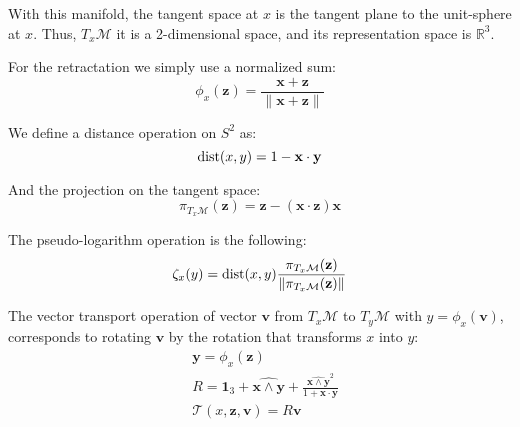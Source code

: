 With this manifold, the tangent space at $x$ is the tangent plane to the unit-sphere at $x$.
Thus, $T_x\mathcal{M}$ it is a 2-dimensional space, and its representation space is $\mathbb{R}^3$.

For the retractation we simply use a normalized sum:
\begin{equation}
  \phi_x(\mathbf{z}) = \frac{\mathbf{x}+\mathbf{z}}{\|\mathbf{x}+\mathbf{z}\|}
\end{equation}

We define a distance operation on $S^2$ as:
\begin{equation}
  \operatorname{dist}(x, y) = 1-\mathbf{x}\cdot \mathbf{y}
\end{equation}

And the projection on the tangent space:
\begin{equation}
  \pi_{T_x\mathcal{M}}(\mathbf{z}) = \mathbf{z} - (\mathbf{x} \cdot \mathbf{z}) \mathbf{x}
\end{equation}

The pseudo-logarithm operation is the following:
\begin{equation}
  \zeta_x(y) = \operatorname{dist}(x,y)\frac{\pi_{T_x\mathcal{M}}(\mathbf{z})}{\|\pi_{T_x\mathcal{M}}(\mathbf{z})\|}
\end{equation}

The vector transport operation of vector $\mathbf{v}$ from $T_x\mathcal{M}$ to $T_y\mathcal{M}$ with $y = \phi_x(\mathbf{v})$, corresponds to rotating $\mathbf{v}$ by the rotation that transforms $x$ into $y$:
\begin{align}
  &\mathbf{y} = \phi_x(\mathbf{z}) \\
  &R = \mathbf{1}_3 + \widehat{\mathbf{x} \wedge \mathbf{y}} + \frac{{\widehat{\mathbf{x} \wedge \mathbf{y} } }^2}{1+\mathbf{x}\cdot\mathbf{y}} \\
  &\mathcal{T}(x,\mathbf{z}, \mathbf{v}) = R\mathbf{v}
\end{align}

